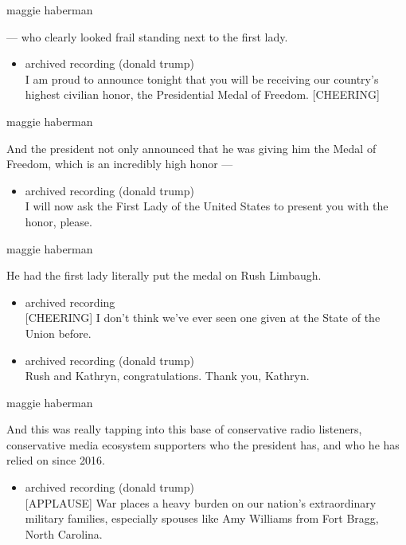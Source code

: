 maggie haberman

--- who clearly looked frail standing next to the first lady.

\begin{itemize}
\tightlist
\item
  archived recording (donald trump)\\
  I am proud to announce tonight that you will be receiving our
  country's highest civilian honor, the Presidential Medal of Freedom.
  {[}CHEERING{]}
\end{itemize}

maggie haberman

And the president not only announced that he was giving him the Medal of
Freedom, which is an incredibly high honor ---

\begin{itemize}
\tightlist
\item
  archived recording (donald trump)\\
  I will now ask the First Lady of the United States to present you with
  the honor, please.
\end{itemize}

maggie haberman

He had the first lady literally put the medal on Rush Limbaugh.

\begin{itemize}
\item
  archived recording\\
  {[}CHEERING{]} I don't think we've ever seen one given at the State of
  the Union before.
\item
  archived recording (donald trump)\\
  Rush and Kathryn, congratulations. Thank you, Kathryn.
\end{itemize}

maggie haberman

And this was really tapping into this base of conservative radio
listeners, conservative media ecosystem supporters who the president
has, and who he has relied on since 2016.

\begin{itemize}
\tightlist
\item
  archived recording (donald trump)\\
  {[}APPLAUSE{]} War places a heavy burden on our nation's extraordinary
  military families, especially spouses like Amy Williams from Fort
  Bragg, North Carolina.
\end{itemize}

